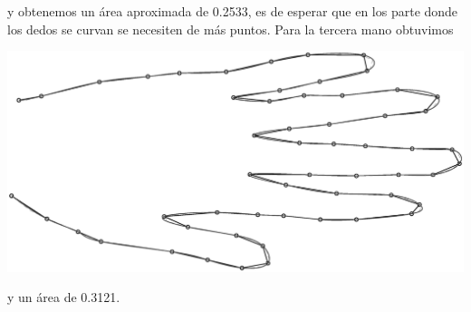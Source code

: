 \begin{solution}
y obtenemos un área aproximada de 0.2533, es de esperar que en los parte donde los dedos se curvan se necesiten de más puntos. Para la tercera mano obtuvimos

\begin{center}
    \includegraphics[scale=0.25]{Graficas/Mano2.eps}
\end{center}

y un área de 0.3121.
\end{solution}

